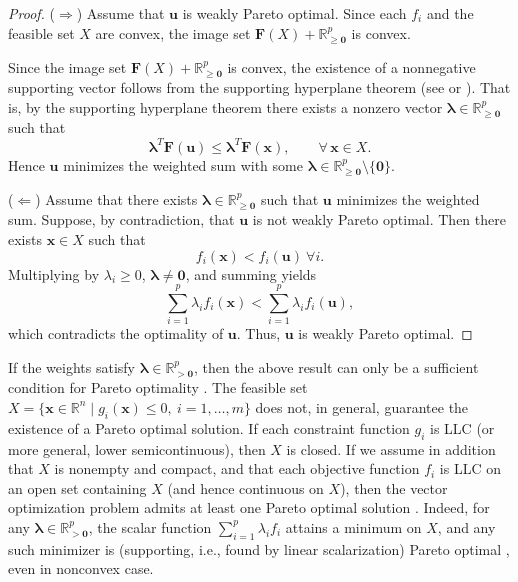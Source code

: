 \documentclass{article}
\theoremstyle{definition}
\begin{document}
\begin{proof}
($\Rightarrow$)
Assume that $\boldsymbol u$ is weakly Pareto optimal.
Since each $f_i$ and the feasible set $X$ are convex, the image set
    $\boldsymbol F(X)+\mathbb{R}^p_{\ge \boldsymbol 0}$ is convex.

Since the image set $\boldsymbol F(X)+\mathbb{R}^p_{\ge \boldsymbol 0}$
is convex, the existence of a nonnegative supporting vector follows from the supporting hyperplane theorem (see  \cite{Ehrgott} or \cite{Rockafellar}). That is, by the supporting hyperplane theorem there exists a nonzero vector
$\boldsymbol\lambda\in\mathbb{R}^p_{\ge \boldsymbol 0}$ such that
\[
\boldsymbol\lambda^T \boldsymbol F(\boldsymbol u)
\le
\boldsymbol\lambda^T \boldsymbol F(\boldsymbol x),
\qquad \forall\,\boldsymbol x\in X .
\]
Hence $\boldsymbol u$ minimizes the weighted sum with some
$\boldsymbol\lambda\in\mathbb{R}^p_{\ge \boldsymbol 0}\setminus\{\boldsymbol 0\}$.

($\Leftarrow$)
Assume that there exists $\boldsymbol\lambda\in\mathbb{R}^p_{\ge \boldsymbol 0}$ such that
$\boldsymbol u$ minimizes the weighted sum.
Suppose, by contradiction, that $\boldsymbol u$ is not weakly Pareto optimal.
Then there exists $\boldsymbol x\in X$ such that
\[
f_i(\boldsymbol x)<f_i(\boldsymbol u)\ \forall i.
\]
Multiplying by $\lambda_i\ge 0$, $\boldsymbol\lambda\neq \boldsymbol 0$, and summing yields
\[
\sum_{i=1}^p \lambda_i f_i(\boldsymbol x)
<
\sum_{i=1}^p \lambda_i f_i(\boldsymbol u),
\]
which contradicts the optimality of $\boldsymbol u$.
Thus, $\boldsymbol u$ is weakly Pareto optimal.
\end{proof}

If the weights satisfy $\boldsymbol\lambda\in\mathbb{R}^p_{>\boldsymbol 0}$, then the above result can only be a sufficient condition for Pareto optimality \cite{Ehrgott}.
The feasible set $X=\{\boldsymbol x\in\mathbb{R}^n \mid g_i(\boldsymbol x)\le 0,\ i=1,\dots,m\}$
does not, in general, guarantee the existence of a Pareto optimal solution.
If each constraint function $g_i$ is LLC (or more general, lower semicontinuous), then $X$ is closed.
If we assume in addition that $X$ is nonempty and compact, and that each objective
function $f_i$ is LLC on an open set containing $X$
(and hence continuous on $X$), then the vector optimization problem admits at least one Pareto optimal solution \cite{Ehrgott}.
Indeed, for any $\boldsymbol\lambda\in\mathbb{R}^p_{> \boldsymbol 0}$, the scalar function
$\sum_{i=1}^p \lambda_i f_i$ attains a minimum on $X$, and any
such minimizer is (supporting, i.e., found by linear scalarization) Pareto optimal \cite{Ehrgott}, even in nonconvex case.
\end{document}
